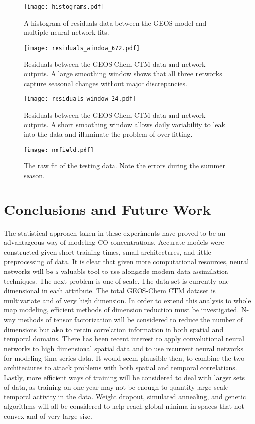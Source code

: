 \begin{figure}[!htb]
\centering
\texttt{[image: histograms.pdf]}
\caption{A histogram of residuals data between the GEOS model and multiple neural network fits.}
\label{fig:nncoH}
\end{figure}

\begin{figure}[!htb]
\centering
\texttt{[image: residuals\_window\_672.pdf]}
\caption{Residuals between the GEOS-Chem CTM data and network outputs. A large smoothing window shows that all three networks capture seasonal changes without major discrepancies.}
\label{fig:nnco28}
\end{figure}

\begin{figure}[!htb]
\centering
\texttt{[image: residuals\_window\_24.pdf]}
\caption{Residuals between the GEOS-Chem CTM data and network outputs. A short smoothing window allows daily variability to leak into the data and illuminate the problem of over-fitting.}
\label{fig:nnco1}
\end{figure}

\begin{figure}[!htb]
\centering
\texttt{[image: nnfield.pdf]}
\caption{The raw fit of the testing data. Note the errors during the summer season.}
\label{fig:nn}
\end{figure}

\section{Conclusions and Future Work}

The statistical approach taken in these experiments have proved to be an advantageous way of modeling CO concentrations. Accurate models were constructed given short training times, small architectures, and little preprocessing of data. It is clear that given more computational resources, neural networks will be a valuable tool to use alongside modern data assimilation techniques. The next problem is one of scale. The data set is currently one dimensional in each attribute. The total GEOS-Chem CTM dataset is multivariate and of very high dimension. In order to extend this analysis to whole map modeling, efficient methods of dimension reduction must be investigated. N-way methods of tensor factorization will be considered to reduce the number of dimensions but also to retain correlation information in both spatial and temporal domains. There has been recent interest to apply convolutional neural networks to high dimensional spatial data and to use recurrent neural networks for modeling time series data. It would seem plausible then, to combine the two architectures to attack problems with both spatial and temporal correlations. Lastly, more efficient ways of training will be considered to deal with larger sets of data, as training on one year may not be enough to quantity large scale temporal activity in the data. Weight dropout, simulated annealing, and genetic algorithms will all be considered to help reach global minima in spaces that not convex and of very large size.